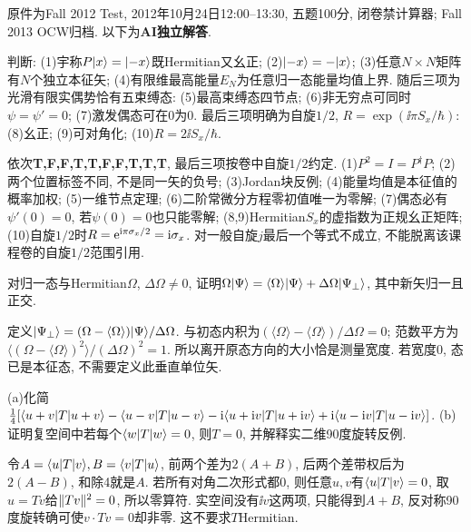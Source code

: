 原件为Fall 2012 Test, 2012年10月24日12:00--13:30, 五题100分, 闭卷禁计算器; Fall 2013 OCW归档. 以下为\textbf{AI独立解答}.
\begin{exercise}
判断: (1)宇称$P\lvert x\rangle=\lvert -x\rangle$既Hermitian又幺正; (2)$\lvert -x\rangle=-\lvert x\rangle$; (3)任意$N\times N$矩阵有$N$个独立本征矢; (4)有限维最高能量$E_N$为任意归一态能量均值上界. 随后三项为光滑有限实偶势恰有五束缚态: (5)最高束缚态四节点; (6)非无穷点可同时$\psi=\psi'=0$; (7)激发偶态可在0为0. 最后三项明确为自旋$1/2$, $R=\exp(\ii\pi S_x/\hbar)$: (8)幺正; (9)可对角化; (10)$R=2\ii S_x/\hbar$.
\end{exercise}
\begin{solution}
依次\textbf{T,F,F,T,T,F,F,T,T,T}, 最后三项按卷中自旋$1/2$约定. (1)$P^2=I=P^\dagger P$; (2)两个位置标签不同, 不是同一矢的负号; (3)Jordan块反例; (4)能量均值是本征值的概率加权; (5)一维节点定理; (6)二阶常微分方程零初值唯一为零解; (7)偶态必有$\psi'(0)=0$, 若$\psi(0)=0$也只能零解; (8,9)Hermitian$S_x$的虚指数为正规幺正矩阵; (10)自旋$1/2$时$R=\mathrm e^{\mathrm i\pi\sigma_x/2}=\mathrm i\sigma_x$. 对一般自旋$j$最后一个等式不成立, 不能脱离该课程卷的自旋$1/2$范围引用.
\end{solution}
\begin{exercise}
对归一态与Hermitian$\Omega$, $\Delta\Omega\neq0$, 证明$\Omega\lvert \Psi\rangle=\langle\Omega\rangle\lvert \Psi\rangle+\Delta\Omega\lvert \Psi_\perp\rangle$, 其中新矢归一且正交.
\end{exercise}
\begin{solution}
定义$\lvert \Psi_\perp\rangle=(\Omega-\langle\Omega\rangle)\lvert \Psi\rangle/\Delta\Omega$. 与初态内积为$(\langle\Omega\rangle-\langle\Omega\rangle)/\Delta\Omega=0$; 范数平方为$\langle(\Omega-\langle\Omega\rangle)^2\rangle/(\Delta\Omega)^2=1$. 所以离开原态方向的大小恰是测量宽度. 若宽度0, 态已是本征态, 不需要定义此垂直单位矢.
\end{solution}
\begin{exercise}
(a)化简$\tfrac14[\langle u+v\rvert T\lvert u+v\rangle-\langle u-v\rvert T\lvert u-v\rangle-\mathrm i\langle u+\mathrm i v\rvert T\lvert u+\mathrm i v\rangle+\mathrm i\langle u-\mathrm i v\rvert T\lvert u-\mathrm i v\rangle]$. (b)证明复空间中若每个$\langle w\rvert T\lvert w\rangle=0$, 则$T=0$, 并解释实二维90度旋转反例.
\end{exercise}
\begin{solution}
令$A=\langle u\rvert T\lvert v\rangle,B=\langle v\rvert T\lvert u\rangle$, 前两个差为$2(A+B)$, 后两个差带权后为$2(A-B)$, 和除4就是$A$. 若所有对角二次形式都0, 则任意$u,v$有$\langle u\rvert T\lvert v\rangle=0$, 取$u=Tv$给$\lVert Tv\rVert^2=0$, 所以零算符. 实空间没有$\ii v$这两项, 只能得到$A+B$, 反对称90度旋转确可使$v\cdot Tv=0$却非零. 这不要求$T$Hermitian.
\end{solution}
